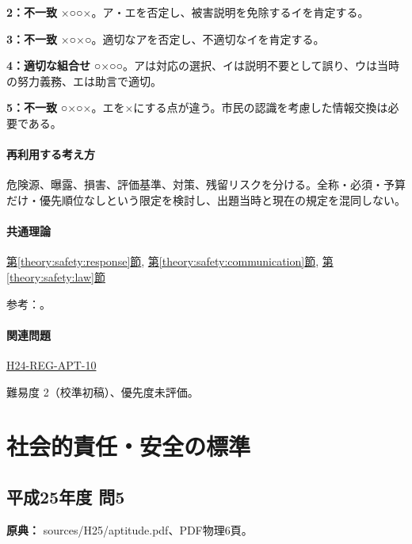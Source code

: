 \noindent\textbf{2：不一致} ×○○×。ア・エを否定し、被害説明を免除するイを肯定する。\par

\noindent\textbf{3：不一致} ×○×○。適切なアを否定し、不適切なイを肯定する。\par

\noindent\textbf{4：適切な組合せ} ○×○○。アは対応の選択、イは説明不要として誤り、ウは当時の努力義務、エは助言で適切。\par

\noindent\textbf{5：不一致} ○×○×。エを×にする点が違う。市民の認識を考慮した情報交換は必要である。\par

\paragraph{再利用する考え方} 危険源、曝露、損害、評価基準、対策、残留リスクを分ける。全称・必須・予算だけ・優先順位なしという限定を検討し、出題当時と現在の規定を混同しない。

\paragraph{共通理論} \hyperref[theory:safety:response]{第\ref*{theory:safety:response}節}, \hyperref[theory:safety:communication]{第\ref*{theory:safety:communication}節}, \hyperref[theory:safety:law]{第\ref*{theory:safety:law}節}

\par 参考：\cite{saf_ra2006,saf_fsc_psych}。

\paragraph{関連問題} \hyperref[q:h24-reg-apt-10]{H24-REG-APT-10}

\par 難易度 2（校準初稿）、優先度未評価。

\section{社会的責任・安全の標準}

\subsection{平成25年度 問5}
\label{q:h25-reg-apt-05}

\noindent\textbf{原典：} sources/H25/aptitude.pdf、PDF物理6頁。

